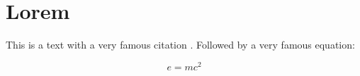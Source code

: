 \chapter{Lorem}
\label{chap:lorem}

This is a text with a very famous citation \cite{MacQueen1967-SMC}.
Followed by a very famous equation:

\begin{equation}
	e = mc^2
\end{equation}